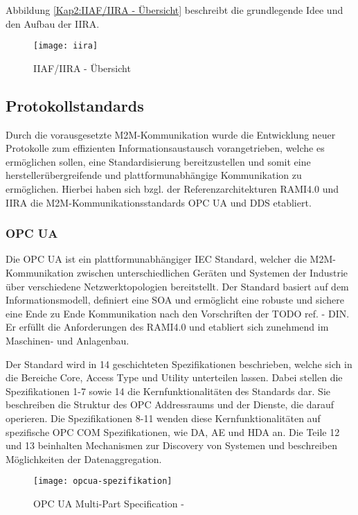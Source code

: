 Abbildung \autoref{Kap2:IIAF/IIRA - Übersicht} beschreibt die grundlegende Idee und den Aufbau der \ac{IIRA}.

\begin{figure}[h]
  \centering
  \texttt{[image: iira]}
  \caption{IIAF/IIRA - Übersicht} 
  \label{Kap2:IIAF/IIRA - Übersicht}
\end{figure}

\clearpage

\subsection{Protokollstandards}
Durch die vorausgesetzte M2M-Kommunikation wurde die Entwicklung neuer Protokolle zum effizienten Informationsaustausch vorangetrieben, welche es ermöglichen sollen, eine Standardisierung bereitzustellen und somit eine herstellerübergreifende und plattformunabhängige Kommunikation zu ermöglichen. Hierbei haben sich bzgl. der Referenzarchitekturen \ac{RAMI4.0} und \ac{IIRA} die \ac{M2M}-Kommunikationsstandards \ac{OPC UA} und \ac{DDS} etabliert.

\subsubsection{\ac{OPC UA}}
Die \ac{OPC UA} ist ein plattformunabhängiger \ac{IEC} Standard, welcher die \ac{M2M}-Kommunikation zwischen unterschiedlichen Geräten und Systemen der Industrie über verschiedene Netzwerktopologien bereitstellt. Der Standard basiert auf dem Informationsmodell, definiert eine \ac{SOA} und ermöglicht eine robuste und sichere eine Ende zu Ende Kommunikation nach den Vorschriften der TODO ref. - DIN. Er erfüllt die Anforderungen des \ac{RAMI4.0} und etabliert sich zunehmend im Maschinen- und Anlagenbau.

Der Standard wird in 14 geschichteten Spezifikationen beschrieben, welche sich in die Bereiche Core, Access Type und Utility unterteilen lassen. Dabei stellen die Spezifikationen 1-7 sowie 14 die Kernfunktionalitäten des Standards dar. Sie beschreiben die Struktur des OPC Addressraums und der Dienste, die darauf operieren. Die Spezifikationen 8-11 wenden diese Kernfunktionalitäten auf spezifische OPC COM Spezifikationen, wie \ac{DA}, \ac{AE} und \ac{HDA} an. Die Teile 12 und 13 beinhalten Mechanismen zur Discovery von Systemen und beschreiben Möglichkeiten der Datenaggregation.

\begin{figure}[h]
  \centering
  \texttt{[image: opcua-spezifikation]}
  \caption{OPC UA Multi-Part Specification - \cite{opcpt1}} 
  \label{Kap2:OPC UA Multi-Part Specification}
\end{figure}

